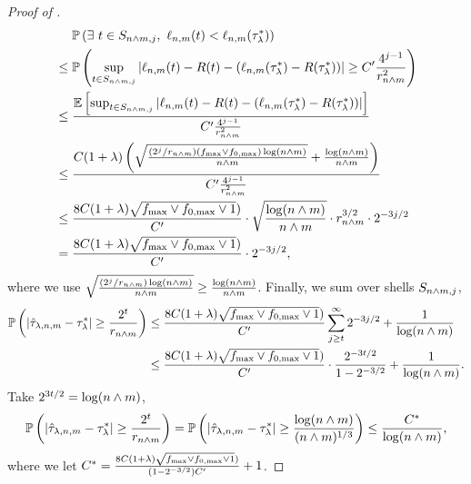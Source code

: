 \begin{proof}[Proof of ]
\begin{align*}
    &~\quad\mathbb{P}\left(
    \exists~{t} \in  S_{{n} \wedge m,j},~ {{\ell}_{{n}, m}}({t}) < {{\ell}_{{n}, m}}({\tau^*_\lambda})
    \right)\\
    &\le \mathbb{P}\left(\sup_{{t} \in S_{{n} \wedge m,j}}\left|{{\ell}_{{n}, m}}({t}) - {R}({t}) - ({{\ell}_{{n}, m}}({\tau^*_\lambda}) - {R}({\tau^*_\lambda}))\right| \ge C'\frac{4^{j-1}}{r_{{n} \wedge m}^2} \right)\\
    &\le \frac{\mathbb{E}\left[\sup_{{t} \in S_{{n} \wedge m,j}}\left|{{\ell}_{{n}, m}}({t}) - {R}({t}) - ({{\ell}_{{n}, m}}({\tau^*_\lambda}) - {R}({\tau^*_\lambda}))\right| \right]}{C'\frac{4^{j-1}}{r_{{n} \wedge m}^2}}\\
    &\le \frac{C (1+\lambda) \left(\sqrt{\frac{(2^j/r_{{n} \wedge m}) ({f_{\max}} \vee {f_{0,\max}})\log({n} \wedge m)}{{n} \wedge m}} + \frac{\log({n} \wedge m)}{{n} \wedge m}\right)}{C'\frac{4^{j-1}}{r_{{n} \wedge m}^2}}\\
    &\le \frac{8C(1+\lambda) \sqrt{{f_{\max}} \vee {f_{0,\max}} \vee 1})}{C'} \cdot \sqrt{\frac{\log({n} \wedge m)}{{n} \wedge m}} \cdot r_{{n} \wedge m}^{3/2} \cdot  2^{-3j/2} \\
    &= \frac{8C(1+\lambda) \sqrt{{f_{\max}} \vee {f_{0,\max}} \vee 1})}{C'} \cdot 2^{-3j/2},
\end{align*}
where we use $\sqrt{\frac{(2^j/r_{{n} \wedge m})\log({n} \wedge m)}{{n} \wedge m}} \ge \frac{\log({n} \wedge m)}{{n} \wedge m}$.
Finally, we sum over shells $S_{{n} \wedge m, j}$,
\begin{align*}
    \mathbb{P}\left(|{\hat{\tau}_{\lambda, {n}, m}}- {\tau^*_\lambda}| \ge \frac{2^t}{r_{{n} \wedge m}}\right)
    &\le \frac{8C(1+\lambda) \sqrt{{f_{\max}} \vee {f_{0,\max}} \vee 1})}{C'}  \sum_{j \ge t}^\infty  2^{-3j/2} + \frac{1}{\log({n} \wedge m)}\\
    &\le \frac{8C(1+\lambda) \sqrt{{f_{\max}} \vee {f_{0,\max}} \vee 1})}{C'} \cdot \frac{2^{-3t/2}}{1-2^{-3/2}} + \frac{1}{\log({n} \wedge m)}.
\end{align*}
Take $2^{3t/2} = \log({n} \wedge m)$,
\begin{align*}
    \mathbb{P}\left(|{\hat{\tau}_{\lambda, {n}, m}}- {\tau^*_\lambda}| \ge \frac{2^t}{r_{{n} \wedge m}}\right)
    = \mathbb{P}\left(|{\hat{\tau}_{\lambda, {n}, m}}- {\tau^*_\lambda}| \ge \frac{\log({n} \wedge m)}{({n} \wedge m)^{1/3}}\right)
    \le \frac{C^*}{\log({n} \wedge m)},
\end{align*}
where we let $C^* =  \frac{8C(1+\lambda) \sqrt{{f_{\max}} \vee {f_{0,\max}} \vee 1})}{(1-2^{-3/2})C'} + 1$.
\end{proof}




